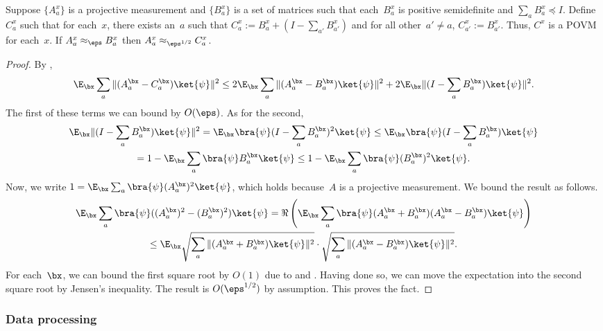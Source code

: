 \documentclass[11pt]{article}
\begin{document}
\begin{fact}\label{fact:sub-zero}
Suppose $\{A^x_a\}$ is a projective measurement and $\{B^x_a\}$ is a set of matrices such that
each~$B^x_a$ is positive semidefinite
and $\sum_{a}B^x_a \preceq I$.
Define $C^x_a$ such that for each~$x$, there exists an~$a$ such that $C^x_a := B^x_a + (I - \sum_{a'} B^x_{a'})$
and for all other~$a' \neq a$, $C^x_{a'} := B^x_{a'}$.
Thus, $C^x$ is a POVM for each~$x$.
If $A^x_a \approx_{\eps} B^x_a$ then $A^x_a \approx_{\eps^{1/2}} C^x_a$.
\end{fact}
\begin{proof}
By ,
\begin{equation*}
\E_{\bx} \sum_a \Vert (A^{\bx}_a - C^{\bx}_a) \ket{\psi} \Vert^2
\leq 2\E_{\bx} \sum_a \Vert (A^{\bx}_a - B^{\bx}_a) \ket{\psi} \Vert^2 + 2 \E_{\bx}\Vert (I - \sum_a B^{\bx}_a) \ket{\psi}\Vert^2.
\end{equation*}
The first of these terms we can bound by $O(\eps)$.  As for the second, 
\begin{multline*}
\E_{\bx}\Vert (I - \sum_a B^{\bx}_a) \ket{\psi}\Vert^2
= \E_{\bx} \bra{\psi} (I-\sum_a B^{\bx}_a)^2 \ket{\psi}
\leq \E_{\bx} \bra{\psi} (I-\sum_a B^{\bx}_a) \ket{\psi}\\
= 1- \E_{\bx} \sum_a\bra{\psi}  B^{\bx}_a \ket{\psi}
\leq1- \E_{\bx} \sum_a\bra{\psi}  (B^{\bx}_a)^2 \ket{\psi}.
\end{multline*}
Now, we write $1 = \E_{\bx} \sum_a \bra{\psi} (A^{\bx}_a)^2 \ket{\psi}$,
which holds because~$A$ is a projective measurement.
We bound the result as follows.
\begin{multline*}
\E_{\bx} \sum_a \bra{\psi} ((A^{\bx}_a)^2  - (B^{\bx}_a)^2)\ket{\psi}
= \Re\left(\E_{\bx} \sum_a \bra{\psi} (A^{\bx}_a  + B^{\bx}_a)(A^{\bx}_a - B^{\bx}_a)\ket{\psi}\right)\\
\leq \E_{\bx} \sqrt{\sum_a \Vert (A^{\bx}_a + B^{\bx}_a) \ket{\psi}\Vert^2}
	\cdot \sqrt{\sum_a \Vert (A^{\bx}_a - B^{\bx}_a)\ket{\psi} \Vert^2}.
\end{multline*}
For each~$\bx$,
we can bound the first square root by $O(1)$
due to  and .
Having done so, we can move the expectation into the second square root by Jensen's inequality.
The result is $O(\eps^{1/2})$ by assumption. This proves the fact.
\end{proof}

\subsubsection{Data processing}
\end{document}
